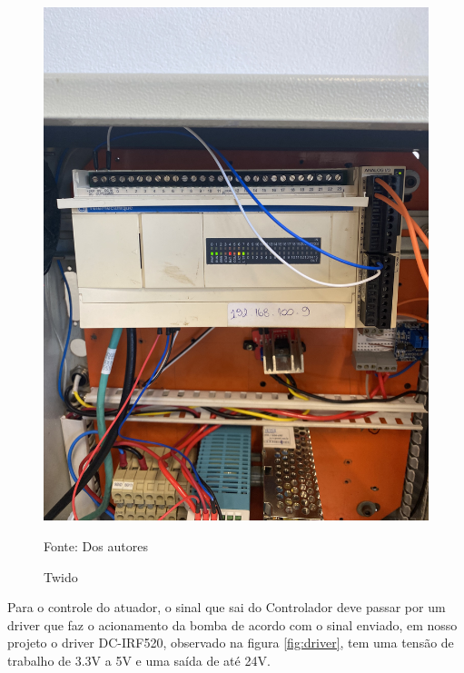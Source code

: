 \begin{figure}[H]
    \centering\footnotesize
    \caption{Twido}
    \begin{center}
        \includegraphics[scale=0.1]{imagens/clp.jpg}
    \end{center}
    \label{fig:clp}
    \par Fonte: Dos autores
\end{figure}

Para o controle do atuador, o sinal que sai do Controlador deve passar por um driver que faz o acionamento da bomba de acordo com o sinal enviado, em nosso projeto o driver DC-IRF520, observado na figura \ref{fig:driver}, tem uma tensão de trabalho de 3.3V a 5V e uma saída de até 24V.

